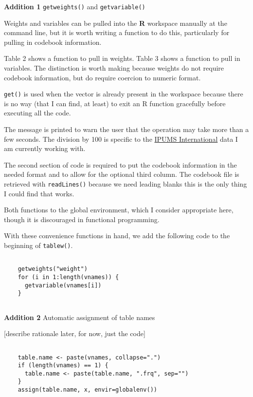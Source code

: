{\bf Addition 1} {\tt getweights()} and {\tt getvariable()}

Weights and variables can be pulled into the {\bf R} workspace manually at the command line, but it is worth writing a function to do this, particularly for pulling in codebook information.

Table 2 shows a function to pull in weights. Table 3 shows a function to pull in variables. The distinction is worth making because weights do not require codebook information, but do require coercion to numeric format.

{\tt get()} is used when the vector is already present in the workspace because there is no way (that I can find, at least) to exit an R function gracefully before executing all the code.

The message is printed to warn the user that the operation may take more than a few seconds. The division by 100 is specific to the \href{}{IPUMS International} data I am currently working with.

The second section of code is required to put the codebook information in the needed format and to allow for the optional third column. The codebook file is retrieved with {\tt readLines()} because we need leading blanks this is the only thing I could find that works.

Both functions to the global environment, which I consider appropriate here, though it is discouraged in functional programming.

With these convenience functions in hand, we add the following code to the beginning of {\tt  tablew()}.

\begin{verbatim}

    getweights("weight")
    for (i in 1:length(vnames)) {
      getvariable(vnames[i])
    }
	
\end{verbatim}


\vspace{12pt}
{\bf Addition 2} Automatic assignment of table names

[describe rationale later, for now, just the code]

\begin{verbatim}

    table.name <- paste(vnames, collapse=".")
    if (length(vnames) == 1) {
      table.name <- paste(table.name, ".frq", sep="")
    }
    assign(table.name, x, envir=globalenv())
	
\end{verbatim}

